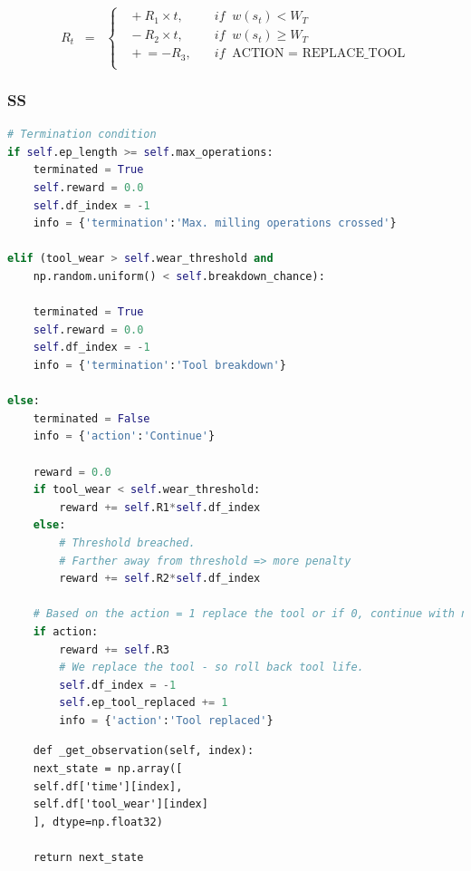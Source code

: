 \documentclass[a4paper, 12pt]{article}
\begin{document}
\begin{equation}
	R_t \;\;=\;\;
	\begin{cases}
		\;\;  +R_1 \times t, & \quad if \;\; w(s_t) < W_T\\
		\;\;  -R_2 \times t, & \quad if \;\; w(s_t) \ge W_T\\
		\;\; \mathrel{+}= -R_3, & \quad if \;\; \text{ACTION = REPLACE\_TOOL}\\
	\end{cases}
	\label{eq:RewardFunction}
\end{equation}

\subsubsection{SS}

\begin{lstlisting}[language=Python, label={lst:SSStep}, caption={Environment: Important implementation details of the 'step' function}]
# Termination condition
if self.ep_length >= self.max_operations:
	terminated = True
	self.reward = 0.0
	self.df_index = -1
	info = {'termination':'Max. milling operations crossed'}

elif (tool_wear > self.wear_threshold and 
	np.random.uniform() < self.breakdown_chance):
	
	terminated = True
	self.reward = 0.0
	self.df_index = -1
	info = {'termination':'Tool breakdown'}

else:
	terminated = False
	info = {'action':'Continue'}
	
	reward = 0.0
	if tool_wear < self.wear_threshold:
		reward += self.R1*self.df_index
	else:
		# Threshold breached. 
		# Farther away from threshold => more penalty
		reward += self.R2*self.df_index 
		
	# Based on the action = 1 replace the tool or if 0, continue with normal operation
	if action:
		reward += self.R3
		# We replace the tool - so roll back tool life. 
		self.df_index = -1
		self.ep_tool_replaced += 1
		info = {'action':'Tool replaced'}
\end{lstlisting}

\begin{verbatim}
	def _get_observation(self, index):
	next_state = np.array([
	self.df['time'][index],
	self.df['tool_wear'][index]
	], dtype=np.float32)
	
	return next_state
\end{verbatim}
\end{document}
